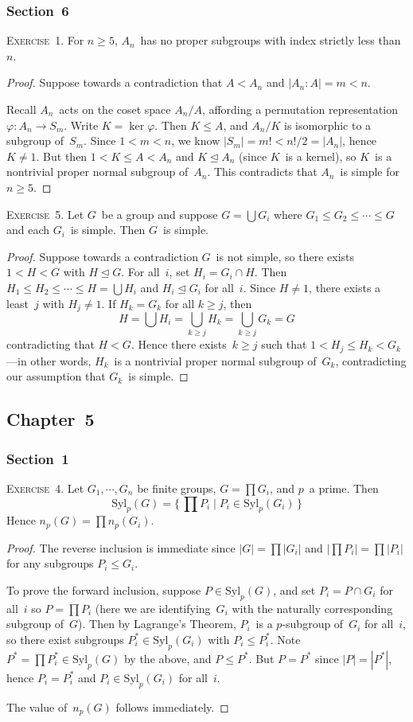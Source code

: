 \documentclass[letterpaper]{article}
\newcommand{\exercise}[1]{\goodbreak\noindent\textsc{Exercise~{#1}.}}
\newcommand{\bigunion}{\bigcup}
\newcommand{\sect}{\cap}
\newcommand{\subgroup}{\le}
\newcommand{\subgroupne}{<}
\newcommand{\normal}{\trianglelefteq}
\newcommand{\syl}{\mathrm{Syl}}
\newcommand{\ord}[1]{|{#1}|}
\newcommand{\gindex}[2]{|{#1}:{#2}|}
\begin{document}
\subsubsection*{Section~6}
\exercise{1}
For $n\ge 5$, $A_n$~has no proper subgroups with index strictly less than~$n$.
\begin{proof}
Suppose towards a contradiction that $A\subgroupne A_n$ and $\gindex{A_n}{A}=m<n$.

Recall $A_n$~acts on the coset space $A_n/A$, affording a permutation representation $\varphi:A_n\to S_m$. Write $K=\ker\varphi$. Then $K\subgroup A$, and $A_n/K$ is isomorphic to a subgroup of~$S_m$. Since $1<m<n$, we know $\ord{S_m}=m!<n!/2=\ord{A_n}$, hence $K\ne 1$. But then $1<K\subgroup A<A_n$ and $K\normal A_n$ (since $K$~is a kernel), so $K$~is a nontrivial proper normal subgroup of~$A_n$. This contradicts that $A_n$~is simple for $n\ge 5$.
\end{proof}

\exercise{5}
Let $G$~be a group and suppose $G=\bigunion G_i$ where $G_1\subgroup G_2\subgroup\cdots\subgroup G$ and each $G_i$~is simple. Then $G$~is simple.
\begin{proof}
Suppose towards a contradiction $G$~is not simple, so there exists $1<H<G$ with $H\normal G$. For all~$i$, set $H_i=G_i\sect H$. Then $H_1\subgroup H_2\subgroup\cdots\subgroup H=\bigunion H_i$ and $H_i\normal G_i$ for all~$i$. Since $H\ne 1$, there exists a least~$j$ with $H_j\ne 1$. If $H_k=G_k$ for all $k\ge j$, then
$$H=\bigunion H_i=\bigunion_{k\ge j} H_k=\bigunion_{k\ge j}G_k=G$$
contradicting that $H<G$. Hence there exists~$k\ge j$ such that $1<H_j\subgroup H_k<G_k$---in other words, $H_k$~is a nontrivial proper normal subgroup of~$G_k$, contradicting our assumption that $G_k$~is simple.
\end{proof}

\subsection*{Chapter~5}
\subsubsection*{Section~1}
\exercise{4}
Let $G_1,\cdots,G_n$ be finite groups, $G=\prod G_i$, and $p$~a prime. Then
$$\syl_p(G)=\bigl\{\,\prod P_i\mid P_i\in\syl_p(G_i)\,\bigr\}$$
Hence $n_p(G)=\prod n_p(G_i)$.
\begin{proof}
The reverse inclusion is immediate since $\ord{G}=\prod\ord{G_i}$ and $\ord{\prod{P_i}}=\prod{\ord{P_i}}$ for any subgroups $P_i\subgroup G_i$.

To prove the forward inclusion, suppose $P\in\syl_p(G)$, and set $P_i=P\sect G_i$ for all~$i$ so $P=\prod P_i$ (here we are identifying~$G_i$ with the naturally corresponding subgroup of~$G$). Then by Lagrange's Theorem, $P_i$~is a $p$-subgroup of~$G_i$ for all~$i$, so there exist subgroups $P_i^*\in\syl_p(G_i)$ with $P_i\subgroup P_i^*$. Note $P^*=\prod P_i^*\in\syl_p(G)$ by the above, and $P\subgroup P^*$. But $P=P^*$ since $\ord{P}=\ord{P^*}$, hence $P_i=P_i^*$ and $P_i\in\syl_p(G_i)$ for all~$i$.

The value of~$n_p(G)$ follows immediately.
\end{proof}
\end{document}
